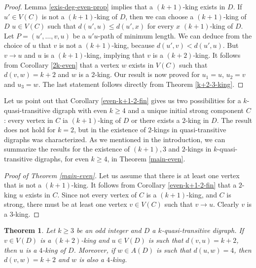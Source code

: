 \documentclass[preprint]{elsarticle}
\newtheorem{thm}{Theorem}[section]
\begin{document}
\begin{proof}
Lemma \ref{exis-deg-even-prop} implies that a $(k+1)$-king exists in $D$.   If $u' \in V(C)$ is not a $(k+1)$-king of $D$, then we can choose a $(k+1)$-king of $D$ $u \in V(C)$ such that $d(u',u) \le d(u',x)$ for every $x$ $(k+1)$-king of $D$.   Let $P = (u', \dots, v,u)$ be a $u'u$-path of minimum length.   We can deduce from the choice of $u$ that $v$ is not a $(k+1)$-king, because $d(u', v) < d(u', u)$.   But $v \to u$ and $u$ is a $(k+1)$-king, implying that $v$ is a $(k+2)$-king.   It follows from Corollary \ref{2k-even} that a vertex $w$ exists in $V(C)$ such that $d(v,w) = k+2$ and $w$ is a $2$-king.   Our result is now proved for $u_1 = u$, $u_2 = v$ and $u_3 = w$.   The last statement follows directly from Theorem \ref{k+2-3-king}.
\end{proof}

Let us point out that Corollary \ref{even-k+1-2-fin} gives us two possibilities for a $k$-quasi-transitive digraph with even $k \ge 4$ and a unique initial strong component $C$:   every vertex in $C$ ia $(k+1)$-king of $D$ or there exists a $2$-king in $D$.   The result does not hold for $k = 2$, but in \cite{BJ-H2} the existence of $2$-kings in quasi-transitive digraphs was characterized.   As we mentioned in the introduction, we can summarize the results for the existence of $(k+1), 3$ and $2$-kings in $k$-quasi-transitive digraphs, for even $k \ge 4$, in Theorem \ref{main-even}.


\begin{proof}[Proof of Theorem \ref{main-even}]
Let us assume that there is at least one vertex that is not a $(k+1)$-king.   It follows from Corollary \ref{even-k+1-2-fin} that a $2$-king $u$ exists in $C$.   Since not every vertex of $C$ is a $(k+1)$-king, and $C$ is strong, there must be at least one vertex $v \in V(C)$ such that $v \to u$.   Clearly $v$ is a $3$-king.
\end{proof}



\begin{thm} \label{k+2-4-king}
Let $k \ge 3$ be an odd integer and $D$ a $k$-quasi-transitive digraph.   If $v \in V(D)$ is a $(k+2)$-king and $u \in V(D)$ is such that $d(v,u) = k+2$, then $u$ is a $4$-king of $D$.  Moreover, if $w \in A(D)$ is such that $d(u,w) = 4$, then $d(v,w) = k+2$ and $w$ is also a $4$-king.
\end{thm}
\end{document}
